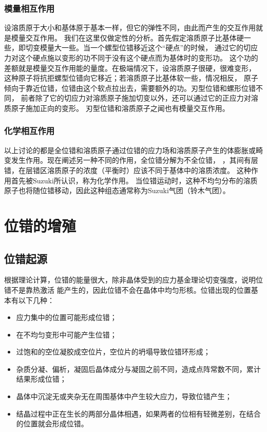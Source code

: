                 \subsubsection{模量相互作用}
                    设溶质原于大小和基体原于基本一样，但它的弹性不同，由此而产生的交互作用就是模量交互作用。
                    我们在这里仅做定性的分析。首先假定溶质原子比基体硬一些，即切变模量大一些。当一个螺型位错移近这个“硬点”的时候，
                    通过它的切应力对这个硬点施以变形的功不同于没有这个硬点而为基体时的变形功。
                    这个功的差额就是模量交互作用能的量度。在极端情况下，设溶质原子很硬，很难变形，
                    这种原子将抗拒螺型位错向它移近；若溶质原子比基体软一些，情况相反，
                    原子倾向于靠近位错，位错由这个软点拉出去，需要额外的功。刃型位错和螺形位错不同，
                    前者除了它的切应力对溶质原子施加切变以外，还可以通过它的正应力对溶质原子施加正向的变形。
                    刃型位错和溶质原子之闻也有模量交互作用。
                \subsubsection{化学相互作用}
                    以上讨论的都是全位错和溶质原子通过位错的应力场和溶质原子产生的体膨胀或畸变发生作用。现在阐述另一种不同的作用，全位错分解为不全位错，
                    ，其间有层错，在层错区溶质原子的浓度（平衡时）应该不同于基体中的溶质浓度。
                    这种作用首先被Suzuki所认识，称为化学作用。
                    当位错运动时，这种不均匀分布的溶质原子也将随位错移动，因此这种组态通常称为Suzuki气团（铃木气团）。

        \section{位错的增殖}
            \subsection{位错起源}
                根据理论计算，位错的能量很大，除非晶体受到的应力基金理论切变强度，说明位错不是靠热激活
                能产生的，因此位错不会在晶体中均匀形核。位错出现的位置基本有以下几种：
                \begin{itemize}
                    \item 应力集中的位置可能形成位错；
                    \item 在不均匀变形中可能产生位错；
                    \item 过饱和的空位凝胶成空位片，空位片的坍塌导致位错环形成；
                    \item 杂质分凝、偏析，凝固后晶体成分与凝固之前不同，造成点阵常数不同，累计结果形成位错；
                    \item 晶体中沉淀无或夹杂无在周围基体中产生较大应力，导致位错产生；
                    \item 结晶过程中正在生长的两部分晶体相遇，如果两者的位相有轻微差别，在结合的位置就会形成位错。
                \end{itemize}
